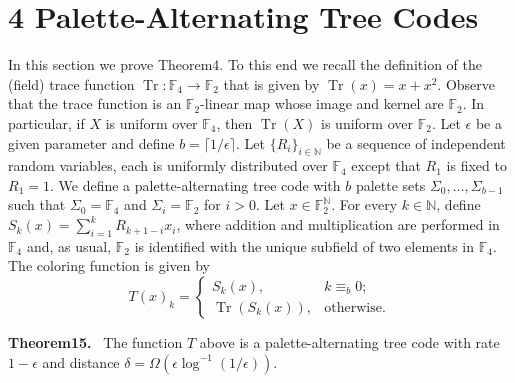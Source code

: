 \documentclass[10pt,a4paper]{article}
\newenvironment{authorclaim}[1]{\par\medskip\noindent\textbf{#1.}\ \ignorespaces}{\par\medskip}
\begin{document}
\section*{4 Palette-Alternating Tree Codes}
In this section we prove Theorem4. To this end we recall the definition of the (field) trace function $\operatorname{Tr}:\mathbb F_4\to\mathbb F_2$ that is given by $\operatorname{Tr}(x)=x+x^2$. Observe that the trace function is an $\mathbb F_2$-linear map whose image and kernel are $\mathbb F_2$. In particular, if $X$ is uniform over $\mathbb F_4$, then $\operatorname{Tr}(X)$ is uniform over $\mathbb F_2$.
Let $\epsilon$ be a given parameter and define $b=\lceil1/\epsilon\rceil$. Let $\{R_i\}_{i\in\mathbb N}$ be a sequence of independent random variables, each is uniformly distributed over $\mathbb F_4$ except that $R_1$ is fixed to $R_1=1$. We define a palette-alternating tree code with $b$ palette sets $\Sigma_0,\ldots,\Sigma_{b-1}$ such that $\Sigma_0=\mathbb F_4$ and $\Sigma_i=\mathbb F_2$ for $i>0$. Let $x\in\mathbb F_2^{\mathbb N}$. For every $k\in\mathbb N$, define $S_k(x)=\sum_{i=1}^kR_{k+1-i}x_i$, where addition and multiplication are performed in $\mathbb F_4$ and, as usual, $\mathbb F_2$ is identified with the unique subfield of two elements in $\mathbb F_4$. The coloring function is given by
\[
T(x)_k=\begin{cases}S_k(x),&k\equiv_b0;\\\operatorname{Tr}(S_k(x)),&\text{otherwise}.\end{cases}
\]
\begin{authorclaim}{Theorem15}
The function $T$ above is a palette-alternating tree code with rate $1-\epsilon$ and distance $\delta=\Omega(\epsilon\log^{-1}(1/\epsilon))$.
\end{authorclaim}
\end{document}
